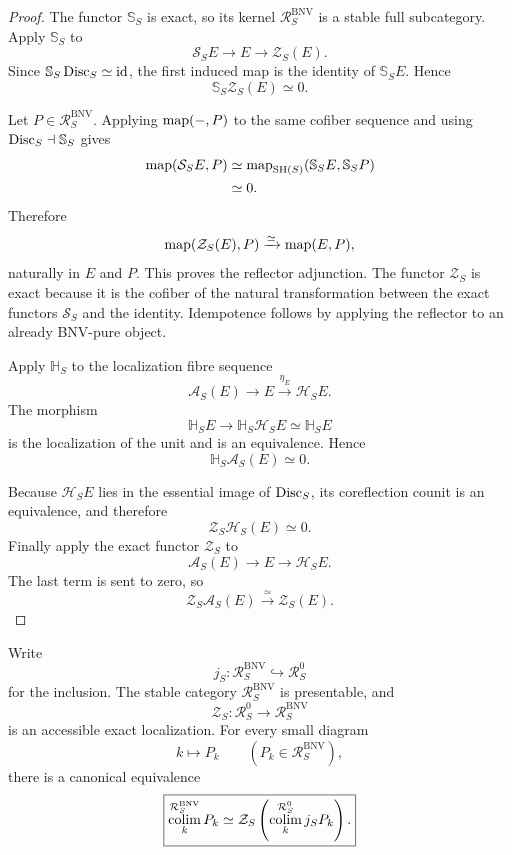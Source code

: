 \begin{proof}
The functor \(\mathbb S_S\) is exact, so its kernel
\(\mathcal R_S^{\mathrm{BNV}}\) is a stable full subcategory.  Apply
\(\mathbb S_S\) to
\[
    \mathcal S_SE\longrightarrow E\longrightarrow\mathcal Z_S(E).
\]
Since \(\mathbb S_S\operatorname{Disc}_S\simeq\operatorname{id}\), the first induced map is the identity
of \(\mathbb S_SE\).  Hence
\[
    \mathbb S_S\mathcal Z_S(E)\simeq0.
\]

Let \(P\in\mathcal R_S^{\mathrm{BNV}}\).  Applying \(\operatorname{map}(-,P)\) to the same
cofiber sequence and using \(\operatorname{Disc}_S\dashv\mathbb S_S\) gives
\[
\begin{aligned}
    \operatorname{map}(\mathcal S_SE,P)
    &\simeq
    \operatorname{map}_{\mathrm{SH}(S)}(\mathbb S_SE,\mathbb S_SP)\\
    &\simeq0.
\end{aligned}
\]
Therefore
\[
    \operatorname{map}(\mathcal Z_S(E),P)
    \xrightarrow{\simeq}
    \operatorname{map}(E,P),
\]
naturally in \(E\) and \(P\).  This proves the reflector adjunction.  The
functor \(\mathcal Z_S\) is exact because it is the cofiber of the natural
transformation between the exact functors \(\mathcal S_S\) and the identity.
Idempotence follows by applying the reflector to an already BNV-pure object.

Apply \(\mathbb H_S\) to the localization fibre sequence
\[
    \mathcal A_S(E)\longrightarrow E
    \xrightarrow{\eta_E}\mathcal H_SE.
\]
The morphism
\[
    \mathbb H_SE
    \longrightarrow
    \mathbb H_S\mathcal H_SE
    \simeq
    \mathbb H_SE
\]
is the localization of the unit and is an equivalence.  Hence
\[
    \mathbb H_S\mathcal A_S(E)\simeq0.
\]

Because \(\mathcal H_SE\) lies in the essential image of \(\operatorname{Disc}_S\), its
coreflection counit is an equivalence, and therefore
\[
    \mathcal Z_S\mathcal H_S(E)\simeq0.
\]
Finally apply the exact functor \(\mathcal Z_S\) to
\[
    \mathcal A_S(E)\longrightarrow E\longrightarrow\mathcal H_SE.
\]
The last term is sent to zero, so
\[
    \mathcal Z_S\mathcal A_S(E)
    \xrightarrow{\simeq}
    \mathcal Z_S(E).
\]
\end{proof}

\begin{proposition}
\label{prop:infinitesimal-bnv-pure-presentable}
Write
\[
    j_S:
    \mathcal R_S^{\mathrm{BNV}}
    \hookrightarrow
    \mathcal R_S^0
\]
for the inclusion.  The stable category
\(\mathcal R_S^{\mathrm{BNV}}\) is presentable, and
\[
    \mathcal Z_S:
    \mathcal R_S^0
    \longrightarrow
    \mathcal R_S^{\mathrm{BNV}}
\]
is an accessible exact localization.  For every small diagram
\[
    k\longmapsto P_k
    \qquad
    (P_k\in\mathcal R_S^{\mathrm{BNV}}),
\]
there is a canonical equivalence
\[
    \boxed{
    \operatorname*{colim}_k^{\mathcal R_S^{\mathrm{BNV}}}P_k
    \simeq
    \mathcal Z_S
    \left(
      \operatorname*{colim}_k^{\mathcal R_S^0}j_SP_k
    \right).
    }
\]
\end{proposition}

